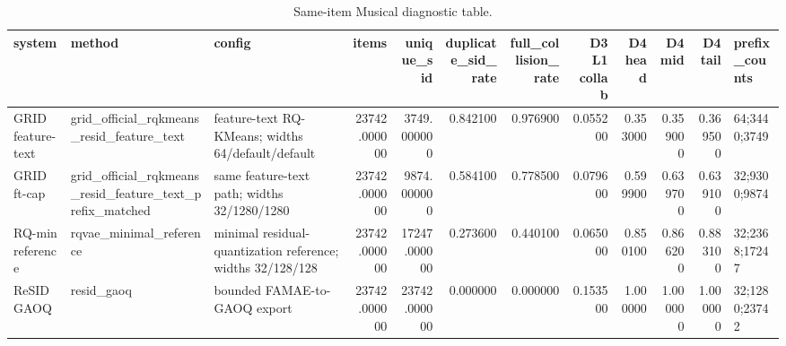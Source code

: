 \begin{table}
\caption{Same-item Musical diagnostic table.}
\label{tab:musical-diagnostic}
\begin{tabular}{lllrrrrrrrrl}
\toprule
system & method & config & items & unique\_sid & duplicate\_sid\_rate & full\_collision\_rate & D3 L1 collab & D4 head & D4 mid & D4 tail & prefix\_counts \\
\midrule
GRID feature-text & grid\_official\_rqkmeans\_resid\_feature\_text & feature-text RQ-KMeans; widths 64/default/default & 23742.000000 & 3749.000000 & 0.842100 & 0.976900 & 0.055200 & 0.353000 & 0.359000 & 0.369500 & 64;3440;3749 \\
GRID ft-cap & grid\_official\_rqkmeans\_resid\_feature\_text\_prefix\_matched & same feature-text path; widths 32/1280/1280 & 23742.000000 & 9874.000000 & 0.584100 & 0.778500 & 0.079600 & 0.599900 & 0.639700 & 0.639100 & 32;9300;9874 \\
RQ-min reference & rqvae\_minimal\_reference & minimal residual-quantization reference; widths 32/128/128 & 23742.000000 & 17247.000000 & 0.273600 & 0.440100 & 0.065000 & 0.850100 & 0.866200 & 0.883100 & 32;2368;17247 \\
ReSID GAOQ & resid\_gaoq & bounded FAMAE-to-GAOQ export & 23742.000000 & 23742.000000 & 0.000000 & 0.000000 & 0.153500 & 1.000000 & 1.000000 & 1.000000 & 32;1280;23742 \\
\bottomrule
\end{tabular}
\end{table}
